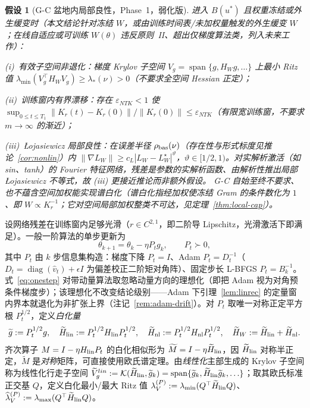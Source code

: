\documentclass[fontset=windows,11pt]{ctexart}
\newcommand{\W}{W}
\newcommand{\wt}[1]{\widetilde{#1}}
\DeclareMathOperator{\diag}{diag}
\DeclareMathOperator{\spanop}{span}
\newtheorem{assumption}{假设}[section]
\numberwithin{equation}{section}
\begin{document}
\begin{assumption}[G-C 盆地内局部良性，Phase~1，弱化版]\label{ass:GC}
进入 $B(u^*)$ 且权重冻结或\emph{外生缓变}时（本文结论针对冻结 $\W$，或由训练时间表/未加权量触发的外生缓变 $\W$；在线自适应或可训练 $\W(\theta)$ 违反原则~II、超出仅梯度算法类，列入未来工作）：
\par(i)~\emph{有效子空间非退化}：梯度 Krylov 子空间 $V_g=\spanop\{g,H_{\W}g,\ldots\}$ 上最小 Ritz 值 $\lambda_{\min}(V_g^\top H_{\W}V_g)\ge\lambda_*(\nu)>0$（不要求全空间 Hessian 正定）；
\par(ii)~\emph{训练窗内有界漂移}：存在 $\varepsilon_{NTK}<1$ 使 $\sup_{0\le t\le T_1}\|K_r(t)-K_r(0)\|/\|K_r(0)\|\le\varepsilon_{NTK}$（有限宽训练窗，不要求 $m\to\infty$ 的渐近）；
\par(iii)~\emph{{\L}ojasiewicz 局部良性}：在误差半径 $\rho_{\rm bas}(\nu)$（存在性与形式标度见推论~\ref{cor:nonlin}）内 $\|\nabla L_{\W}\|\ge c_L|L_{\W}-L_{\W}^\star|^\vartheta$，$\vartheta\in[1/2,1)$。对实解析激活（如 sin、tanh）的 Fourier 特征网络，残差是参数的实解析函数、由解析性\emph{推出}局部 {\L}ojasiewicz 不等式，故 (iii) 更接近推论而非额外假设。
\emph{G-C 自始至终不要求、也不蕴含空间加权能实现谱白化}（谱白化指经加权使冻结 Gram 的条件数化为 $1$、即 $\W\propto K_r^{-1}$；它对空间局部加权整类不可达，见定理~\ref{thm:local-cap}）。
\end{assumption}

设网络残差在训练窗内足够光滑（$r\in C^{2,1}$，即二阶导 Lipschitz，光滑激活下即满足）。一般一阶算法的单步更新为
\begin{equation}\label{eq:onestep}
\theta_{k+1}=\theta_k-\eta P_t g_k,\qquad P_t\succ0,
\end{equation}
其中 $P_t$ 由 $k$ 步信息集构造：梯度下降 $P_t=I$、Adam $P_t=D_t^{-1}$（$D_t=\diag(\hat v_t)+\epsilon I$ 为偏差校正二阶矩对角阵）、固定步长 L-BFGS $P_t=B_k^{-1}$。式~\eqref{eq:onestep} 对带动量算法取忽略动量方向的理想化（即把 Adam 视为对角预条件梯度步）；该理想化不改变结论级别——Adam 下引理~\ref{lem:linrec} 的定量窗内界本就退化为非扩张上界（注记~\ref{rem:adam-drift}）。对 $P_t$ 取唯一对称正定平方根 $P_t^{1/2}$，定义\emph{白化量}
\begin{align}
\wt g:=P_t^{1/2}g,\quad \wt H_{\rm lin}:=P_t^{1/2}H_{\rm lin}P_t^{1/2},\quad
\wt H_{\rm nl}:=P_t^{1/2}H_{\rm nl}P_t^{1/2},\quad \wt H_{\W}:=\wt H_{\rm lin}+\wt H_{\rm nl}.\label{eq:white}
\end{align}
齐次算子 $M=I-\eta H_{\rm lin}P_t$ 的白化相似形为 $\wt M=I-\eta\wt H_{\rm lin}$，因 $\wt H_{\rm lin}$ 对称半正定，$\wt M$ 是\emph{对称}矩阵，可直接使用欧氏谱定理。由\emph{线性化}主部生成的 Krylov 子空间称为线性化行走子空间 $\wt V_g^{lin}:=\mathcal K(\wt H_{\rm lin},\wt g_k)=\spanop\{\wt g_k,\wt H_{\rm lin}\wt g_k,\ldots\}$；取其欧氏标准正交基 $Q$，定义白化最小/最大 Ritz 值 $\lambda_V^{(P)}:=\lambda_{\min}(Q^\top\wt H_{\rm lin}Q)$、$\widehat\lambda_V^{(P)}:=\lambda_{\max}(Q^\top\wt H_{\rm lin}Q)$。
\end{document}
